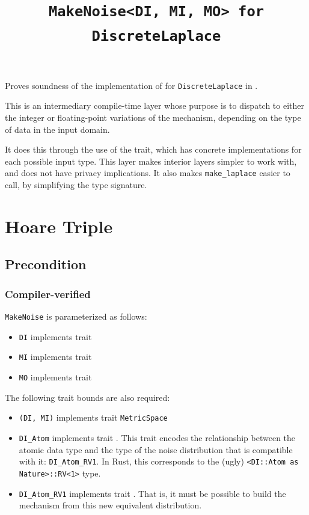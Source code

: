 \documentclass{article}
\title{\texttt{MakeNoise<DI, MI, MO> for DiscreteLaplace}}
\author{\MichaelShoemateAuthor}
\date{}
\begin{document}
\maketitle

\contrib
Proves soundness of the implementation of 
for \texttt{DiscreteLaplace} in .

This is an intermediary compile-time layer whose purpose is
to dispatch to either the integer or floating-point variations of the mechanism,
depending on the type of data in the input domain.

It does this through the use of the  trait,
which has concrete implementations for each possible input type.
This layer makes interior layers simpler to work with, and does not have privacy implications.
It also makes \texttt{make\_laplace} easier to call,
by simplifying the type signature.

\section{Hoare Triple}
\subsection*{Precondition}
\subsubsection*{Compiler-verified}
\texttt{MakeNoise} is parameterized as follows:
\begin{itemize}
    \item \texttt{DI} implements trait 
    \item \texttt{MI} implements trait 
    \item \texttt{MO} implements trait 
\end{itemize}

The following trait bounds are also required:
\begin{itemize}
    \item \texttt{(DI, MI)} implements trait \texttt{MetricSpace}
    \item \texttt{DI\_Atom} implements trait .
        This trait encodes the relationship between the atomic data type
        and the type of the noise distribution that is compatible with it: \texttt{DI\_Atom\_RV1}.
        In Rust, this corresponds to the (ugly) \texttt{<DI::Atom as Nature>::RV<1>} type.
    \item \texttt{DI\_Atom\_RV1} implements trait .
        That is, it must be possible to build the mechanism from this new equivalent distribution.
\end{itemize}
\end{document}
